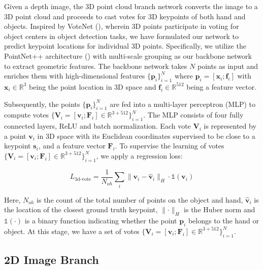 Given a depth image, the 3D point cloud branch network converts the image to a 3D point cloud and proceeds to cast votes for 3D keypoints of both hand and objects. Inspired by VoteNet (\cite{qi2019deep}), wherein 3D points participate in voting for object centers in object detection tasks, we have formulated our network to predict keypoint locations for individual 3D points. Specifically, we utilize the PointNet++ architecture (\cite{qi2017pointnet++}) with multi-scale grouping as our backbone network to extract geometric features. The backbone network takes $N$ points as input and enriches them with high-dimensional features $\{\mathbf{p}_{i}\}_{i=1}^{N}$ where $\mathbf{p}_{i} = [\mathbf{x}_i; \mathbf{f}_i]$ with $\mathbf{x}_{i}\in\mathbb{R}^{3}$ being the point location in 3D space and $\mathbf{f}_{i} \in \mathbb{R}^{512}$ being a feature vector.

Subsequently, the points $\{\mathbf{p}_{i}\}_{i=1}^{N}$ are fed into a multi-layer perceptron (MLP) to compute votes $\{\mathbf{V}_{i} = [\mathbf{v}_{i}; \mathbf{F}_{i}] \in \mathbb{R}^{3+512} \}_{i=1}^{N}$. The MLP consists of four fully connected layers, ReLU and batch normalization. Each vote $\mathbf{V}_i$ is represented by a point $\mathbf{v}_{i}$ in 3D space with its Euclidean coordinates supervised to be close to a keypoint $\mathbf{s}_i$, and a feature vector $\mathbf{F}_{i}$. To supervise the learning of votes $\{\mathbf{V}_{i} = [\mathbf{v}_{i}; \mathbf{F}_{i}] \in \mathbb{R}^{3+512} \}_{i=1}^{N}$, we apply a regression loss:

\begin{equation}
L_{\text{3d-vote}} = \dfrac{1}{N_{oh}} \sum_{i}  \| \mathbf{v}_{i} - \hat{\mathbf{v}}_{i} \|_{H} \cdot \mathds{1}(\mathbf{v}_{i})
\end{equation}

\noindent Here, $N_{oh}$ is the count of the total number of points on the object and hand, $\hat{\mathbf{v}}_{i}$ is the location of the closest ground truth keypoint, $\parallel\cdot\parallel_{H}$ is the Huber norm and $\mathds{1}(\cdot)$ is a binary function indicating whether the point $\mathbf{p}_i$ belongs to the hand or object. At this stage, we have a set of votes $\{\mathbf{V}_i = [\mathbf{v}_i; \mathbf{F}_i] \in \mathbb{R}^{3+512}\}_{i=1}^{N}$.

\subsection{2D Image Branch}

